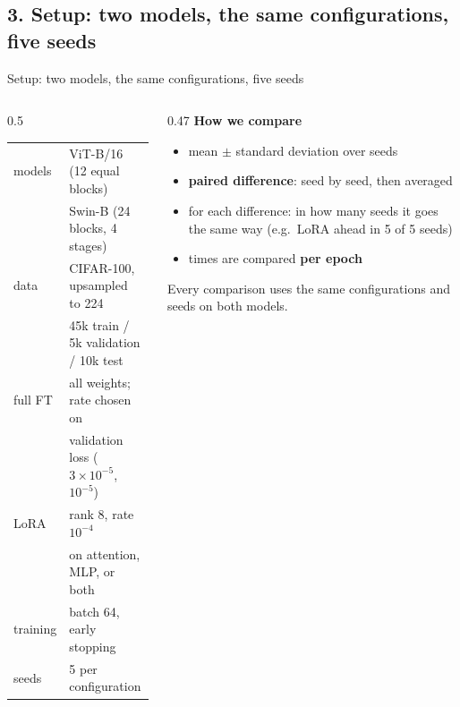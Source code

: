 \documentclass[aspectratio=169,11pt]{beamer}
\begin{document}
\subsection{3. Setup: two models, the same configurations, five seeds}
\begin{frame}{Setup: two models, the same configurations, five seeds}
\begin{columns}[T]
\begin{column}{0.5\textwidth}
\small
\begin{tabular}{@{}ll@{}}
\toprule
models & ViT-B/16 (12 equal blocks)\\
 & Swin-B (24 blocks, 4 stages)\\
data & CIFAR-100, upsampled to 224\\
 & 45k train / 5k validation / 10k test\\
full FT & all weights; rate chosen on\\
 & validation loss ($3{\times}10^{-5}$, $10^{-5}$)\\
LoRA & rank 8, rate $10^{-4}$\\
 & on attention, MLP, or both\\
training & batch 64, early stopping\\
seeds & 5 per configuration\\
\bottomrule
\end{tabular}
\end{column}
\begin{column}{0.47\textwidth}
\small
\textbf{How we compare}
\begin{itemize}
  \item mean $\pm$ standard deviation over seeds
  \item \textbf{paired difference}: seed by seed, then averaged
  \item for each difference: in how many seeds it goes the same way (e.g.\ LoRA ahead in 5 of 5 seeds)
  \item times are compared \textbf{per epoch}
\end{itemize}
\medskip
Every comparison uses the same configurations and seeds on both models.
\end{column}
\end{columns}
\end{frame}

\end{document}

